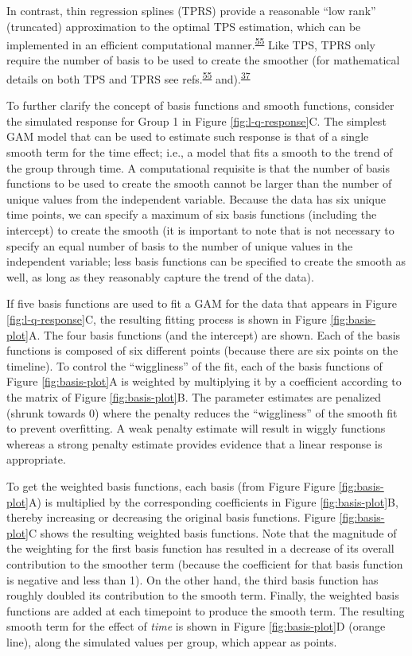 \documentclass[
]{article}
\begin{document}
In contrast, thin regression splines (TPRS) provide a reasonable ``low rank'' (truncated) approximation to the optimal TPS estimation, which can be implemented in an efficient computational manner.\textsuperscript{\protect\hyperlink{ref-wood2003}{55}} Like TPS, TPRS only require the number of basis to be used to create the smoother (for mathematical details on both TPS and TPRS see refs.\textsuperscript{\protect\hyperlink{ref-wood2003}{55}} and).\textsuperscript{\protect\hyperlink{ref-wood2017}{37}}

To further clarify the concept of basis functions and smooth functions, consider the simulated response for Group 1 in Figure \ref{fig:l-q-response}C. The simplest GAM model that can be used to estimate such response is that of a single smooth term for the time effect; i.e., a model that fits a smooth to the trend of the group through time. A computational requisite is that the number of basis functions to be used to create the smooth cannot be larger than the number of unique values from the independent variable. Because the data has six unique time points, we can specify a maximum of six basis functions (including the intercept) to create the smooth (it is important to note that is not necessary to specify an equal number of basis to the number of unique values in the independent variable; less basis functions can be specified to create the smooth as well, as long as they reasonably capture the trend of the data).

If five basis functions are used to fit a GAM for the data that appears in Figure \ref{fig:l-q-response}C, the resulting fitting process is shown in Figure \ref{fig:basis-plot}A. The four basis functions (and the intercept) are shown. Each of the basis functions is composed of six different points (because there are six points on the timeline). To control the ``wiggliness'' of the fit, each of the basis functions of Figure \ref{fig:basis-plot}A is weighted by multiplying it by a coefficient according to the matrix of Figure \ref{fig:basis-plot}B. The parameter estimates are penalized (shrunk towards 0) where the penalty reduces the ``wiggliness'' of the smooth fit to prevent overfitting. A weak penalty estimate will result in wiggly functions whereas a strong penalty estimate provides evidence that a linear response is appropriate.

To get the weighted basis functions, each basis (from Figure Figure \ref{fig:basis-plot}A) is multiplied by the corresponding coefficients in Figure \ref{fig:basis-plot}B, thereby increasing or decreasing the original basis functions. Figure \ref{fig:basis-plot}C shows the resulting weighted basis functions. Note that the magnitude of the weighting for the first basis function has resulted in a decrease of its overall contribution to the smoother term (because the coefficient for that basis function is negative and less than 1). On the other hand, the third basis function has roughly doubled its contribution to the smooth term. Finally, the weighted basis functions are added at each timepoint to produce the smooth term. The resulting smooth term for the effect of \emph{time} is shown in Figure \ref{fig:basis-plot}D (orange line), along the simulated values per group, which appear as points.
\end{document}
